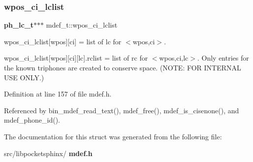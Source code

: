 \mbox{\label{structmdef__t_a5dd5c3d3058a314f4c971a14d1df5f38}} 
\subsubsection{wpos\+\_\+ci\+\_\+lclist}
{\footnotesize\ttfamily \textbf{ ph\+\_\+lc\+\_\+t}$\ast$$\ast$$\ast$ mdef\+\_\+t\+::wpos\+\_\+ci\+\_\+lclist}



wpos\+\_\+ci\+\_\+lclist[wpos][ci] = list of lc for $<$wpos,ci$>$. 

wpos\+\_\+ci\+\_\+lclist[wpos][ci][lc].rclist = list of rc for $<$wpos,ci,lc$>$. Only entries for the known triphones are created to conserve space. (N\+O\+TE\+: F\+OR I\+N\+T\+E\+R\+N\+AL U\+SE O\+N\+LY.) 

Definition at line 157 of file mdef.\+h.



Referenced by bin\+\_\+mdef\+\_\+read\+\_\+text(), mdef\+\_\+free(), mdef\+\_\+is\+\_\+cisenone(), and mdef\+\_\+phone\+\_\+id().



The documentation for this struct was generated from the following file\+:\begin{DoxyCompactItemize}
\item 
src/libpocketsphinx/\textbf{ mdef.\+h}\end{DoxyCompactItemize}
